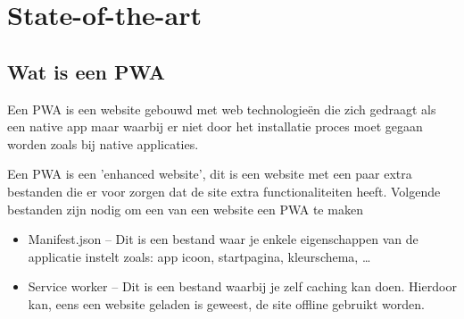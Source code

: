  




\section{State-of-the-art}
\label{sec:state-of-the-art}
\subsection{Wat is een PWA}

Een PWA is een website gebouwd met web technologieën die zich gedraagt als een native app maar waarbij er niet door het installatie proces moet gegaan worden zoals bij native applicaties.
\autocite{Sayali2018}

Een PWA is een 'enhanced website', dit is een website met een paar extra bestanden die er voor zorgen dat de site extra functionaliteiten heeft. Volgende bestanden zijn nodig om een van een website een PWA te maken
\begin{itemize}
    \item Manifest.json – Dit is een bestand waar je enkele eigenschappen van de applicatie instelt zoals: app icoon, startpagina, kleurschema, …
    \item Service worker – Dit is een bestand waarbij je zelf caching kan doen. Hierdoor kan, eens een website geladen is geweest, de site offline gebruikt worden.
\end{itemize}
\autocite{Harris2017}

